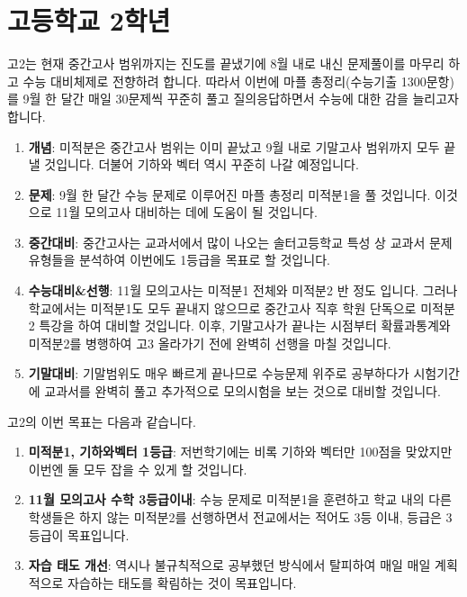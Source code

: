 \documentclass[final]{IEEEphot}
\begin{document}
\section{고등학교 2학년}

\hspace{0.3cm} 고2는 현재 중간고사 범위까지는 진도를 끝냈기에 8월 내로 내신 문제풀이를 마무리 하고 수능 대비체제로 전향하려 합니다. 따라서 이번에 마플 총정리(수능기출 1300문항)를 9월 한 달간
매일 30문제씩 꾸준히 풀고 질의응답하면서 수능에 대한 감을 늘리고자 합니다.

\begin{enumerate}
 \item \textbf{개념}: 미적분은 중간고사 범위는 이미 끝났고 9월 내로 기말고사 범위까지 모두 끝낼 것입니다. 더불어 기하와 벡터 역시 꾸준히 나갈 예정입니다. \vspace{0.1cm}
 \item \textbf{문제}: 9월 한 달간 수능 문제로 이루어진 마플 총정리 미적분1을 풀 것입니다. 이것으로 11월 모의고사 대비하는 데에 도움이 될 것입니다. \vspace{0.1cm}
 \item \textbf{중간대비}: 중간고사는 교과서에서 많이 나오는 솔터고등학교 특성 상 교과서 문제 유형들을 분석하여 이번에도 1등급을 목표로 할 것입니다. \vspace{0.1cm}
 \item \textbf{수능대비\&선행}: 11월 모의고사는 미적분1 전체와 미적분2 반 정도 입니다. 그러나 학교에서는 미적분1도 모두 끝내지 않으므로 중간고사 직후 학원 단독으로 미적분2 특강을 하여 대비할 것입니다. 
 이후, 기말고사가 끝나는 시점부터 확률과통계와 미적분2를 병행하여 고3 올라가기 전에 완벽히 선행을 마칠 것입니다.\vspace{0.1cm}
 \item \textbf{기말대비}: 기말범위도 매우 빠르게 끝나므로 수능문제 위주로 공부하다가 시험기간에 교과서를 완벽히 풀고 추가적으로 모의시험을 보는 것으로 대비할 것입니다.
\end{enumerate}

고2의 이번 목표는 다음과 같습니다.

\begin{enumerate}
 \item \textbf{미적분1, 기하와벡터 1등급}: 저번학기에는 비록 기하와 벡터만 100점을 맞았지만 이번엔 둘 모두 잡을 수 있게 할 것입니다. \vspace{0.1cm}
 \item \textbf{11월 모의고사 수학 3등급이내}: 수능 문제로 미적분1을 훈련하고 학교 내의 다른 학생들은 하지 않는 미적분2를 선행하면서 전교에서는 적어도 3등 이내, 등급은 3등급이 목표입니다. \vspace{0.1cm}
 \item \textbf{자습 태도 개선}: 역시나 불규칙적으로 공부했던 방식에서 탈피하여 매일 매일 계획적으로 자습하는 태도를 확림하는 것이 목표입니다.
\end{enumerate}
\end{document}

